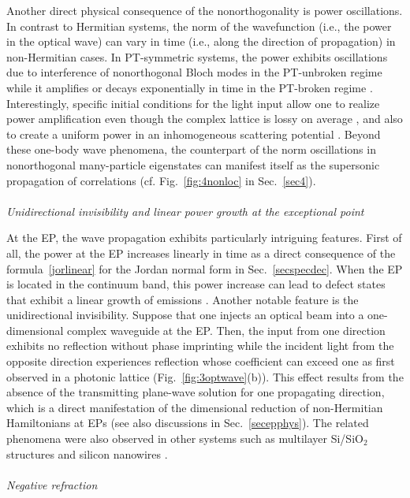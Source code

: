 \documentclass{tADP2e}
\theoremstyle{plain}
\theoremstyle{plain}
\theoremstyle{definition}
\begin{document}
Another direct physical consequence of the nonorthogonality is power oscillations. In contrast to Hermitian systems, the norm of the wavefunction (i.e., the power in the optical wave) can vary in time (i.e., along the direction of propagation) in non-Hermitian cases. In PT-symmetric systems, the power exhibits oscillations due to interference of nonorthogonal Bloch modes in the PT-unbroken regime while it amplifies or decays exponentially in time in the PT-broken regime \cite{REG07,KS082}. Interestingly, specific initial conditions for the light input allow one to realize power amplification even though the complex lattice is  lossy on average \cite{MKG14}, and also to create a uniform power in an inhomogeneous scattering potential \cite{MKG15,MKG17}. 
Beyond these one-body wave phenomena, the counterpart of the norm oscillations in nonorthogonal many-particle eigenstates can manifest itself as the supersonic propagation of correlations \cite{YA18,DB19} (cf. Fig.~\ref{fig:4nonloc} in  Sec.~\ref{sec4}). 
\\
\\
{\it Unidirectional invisibility and linear power growth at the exceptional point}

\vspace{3pt}
\noindent At the EP, the wave propagation exhibits particularly intriguing features. First of all, the power at the EP increases linearly in time as a direct consequence of the  formula~\eqref{jorlinear} for the Jordan normal form in Sec.~\ref{secspecdec}. 
When the EP is located in the continuum band, this power increase can lead to defect states that exhibit a linear growth of emissions \cite{RAA13}.
Another notable feature is the unidirectional invisibility. Suppose that one injects an optical beam into a one-dimensional complex waveguide at the EP. Then, the input from one direction exhibits no reflection without phase imprinting while the incident light from the opposite direction experiences reflection whose coefficient can exceed one as first observed in a photonic lattice \cite{RA12pt} (Fig.~\ref{fig:3optwave}(b)). This effect results from the absence of the transmitting plane-wave solution for one propagating direction, which is a direct manifestation of the dimensional reduction of non-Hermitian Hamiltonians at EPs (see also discussions in Sec.~\ref{secepphys}). The related phenomena were also observed in other systems such as multilayer Si/SiO$_{2}$ structures \cite{LF142} and silicon nanowires \cite{LF13}.
\\
\\
{\it Negative refraction}
\end{document}
